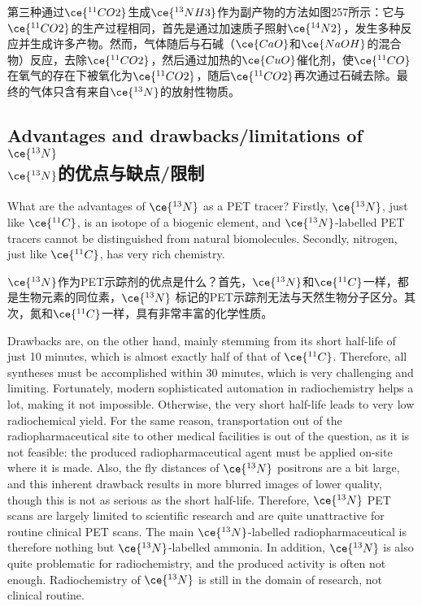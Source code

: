 \documentclass[dvipsnames, svgnames,a4paper,11pt]{article}
\begin{document}
第三种通过\(\ce{^{11}CO2}\)生成\(\ce{^{13}NH3}\)作为副产物的方法如图257所示：它与\(\ce{^{11}CO2}\)的生产过程相同，首先是通过加速质子照射\(\ce{^{14}N2}\)，发生多种反应并生成许多产物。然而，气体随后与石碱（\(\ce{CaO}\)和\(\ce{NaOH}\)的混合物）反应，去除\(\ce{^{11}CO2}\)，然后通过加热的\(\ce{CuO}\)催化剂，使\(\ce{^{11}CO}\)在氧气的存在下被氧化为\(\ce{^{11}CO2}\)，随后\(\ce{^{11}CO2}\)再次通过石碱去除。最终的气体只含有来自\(\ce{^{13}N}\)的放射性物质。

\subsection{Advantages and drawbacks/limitations of \(\ce{^{13}N}\)\\ \(\ce{^{13}N}\)的优点与缺点/限制}  

What are the advantages of \(\ce{^{13}N}\) as a PET tracer? Firstly, \(\ce{^{13}N}\), just like \(\ce{^{11}C}\), is an isotope of a biogenic element, and \(\ce{^{13}N}\)-labelled PET tracers cannot be distinguished from natural biomolecules. Secondly, nitrogen, just like \(\ce{^{11}C}\), has very rich chemistry.

\(\ce{^{13}N}\)作为PET示踪剂的优点是什么？首先，\(\ce{^{13}N}\)和\(\ce{^{11}C}\)一样，都是生物元素的同位素，\(\ce{^{13}N}\) 标记的PET示踪剂无法与天然生物分子区分。其次，氮和\(\ce{^{11}C}\)一样，具有非常丰富的化学性质。

Drawbacks are, on the other hand, mainly stemming from its short half-life of just 10 minutes, which is almost exactly half of that of \(\ce{^{11}C}\). Therefore, all syntheses must be accomplished within 30 minutes, which is very challenging and limiting. Fortunately, modern sophisticated automation in radiochemistry helps a lot, making it not impossible. Otherwise, the very short half-life leads to very low radiochemical yield. For the same reason, transportation out of the radiopharmaceutical site to other medical facilities is out of the question, as it is not feasible: the produced radiopharmaceutical agent must be applied on-site where it is made. Also, the fly distances of \(\ce{^{13}N}\) positrons are a bit large, and this inherent drawback results in more blurred images of lower quality, though this is not as serious as the short half-life. Therefore, \(\ce{^{13}N}\) PET scans are largely limited to scientific research and are quite unattractive for routine clinical PET scans. The main \(\ce{^{13}N}\)-labelled radiopharmaceutical is therefore nothing but \(\ce{^{13}N}\)-labelled ammonia. In addition, \(\ce{^{13}N}\) is also quite problematic for radiochemistry, and the produced activity is often not enough. Radiochemistry of \(\ce{^{13}N}\) is still in the domain of research, not clinical routine.
\end{document}
